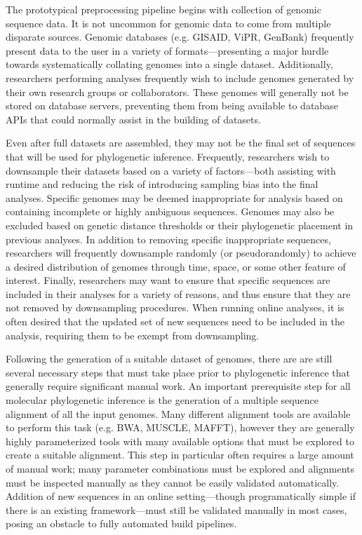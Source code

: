 The prototypical preprocessing pipeline begins with collection of genomic sequence data.
It is not uncommon for genomic data to come from multiple disparate sources.
Genomic databases (e.g. GISAID, ViPR, GenBank) frequently present data to the user in a variety of formats---presenting a major hurdle towards systematically collating genomes into a single dataset.
Additionally, researchers performing analyses frequently wish to include genomes generated by their own research groups or collaborators.
These genomes will generally not be stored on database servers, preventing them from being available to database APIs that could normally assist in the building of datasets.

Even after full datasets are assembled, they may not be the final set of sequences that will be used for phylogenetic inference.
Frequently, researchers wish to downsample their datasets based on a variety of factors---both assisting with runtime and reducing the risk of introducing sampling bias into the final analyses.
Specific genomes may be deemed inappropriate for analysis based on containing incomplete or highly ambiguous sequences.
Genomes may also be excluded based on genetic distance thresholds or their phylogenetic placement in previous analyses.
In addition to removing specific inappropriate sequences, researchers will frequently downsample randomly (or pseudorandomly) to achieve a desired distribution of genomes through time, space, or some other feature of interest.
Finally, researchers may want to ensure that specific sequences are included in their analyses for a variety of reasons, and thus ensure that they are not removed by downsampling procedures.
When running online analyses, it is often desired that the updated set of new sequences need to be included in the analysis, requiring them to be exempt from downsampling.

Following the generation of a suitable dataset of genomes, there are are still several necessary steps that must take place prior to phylogenetic inference that generally require significant manual work.
An important prerequisite step for all molecular phylogenetic inference is the generation of a multiple sequence alignment of all the input genomes.
Many different alignment tools are available to perform this task (e.g. BWA, MUSCLE, MAFFT), however they are generally highly parameterized tools with many available options that must be explored to create a suitable alignment.
This step in particular often requires a large amount of manual work; many parameter combinations must be explored and alignments must be inspected manually as they cannot be easily validated automatically.
Addition of new sequences in an online setting---though programatically simple if there is an existing framework---must still be validated manually in most cases, posing an obstacle to fully automated build pipelines.

